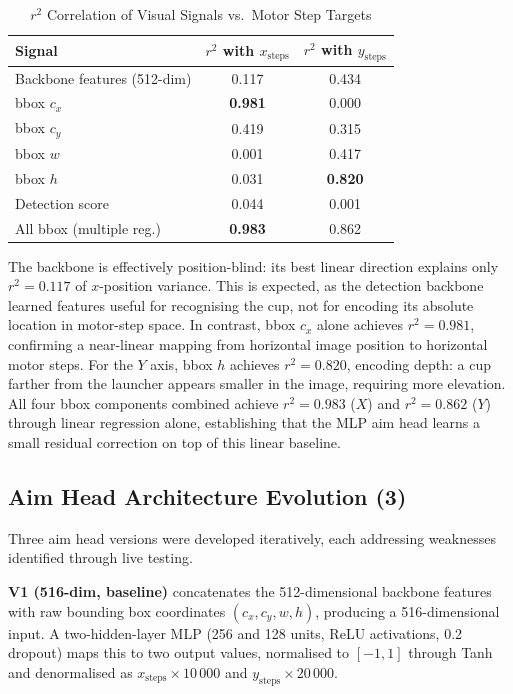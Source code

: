 \documentclass[conference]{IEEEtran}
\begin{document}
\begin{table}[ht]
\centering
\caption{$r^{2}$ Correlation of Visual Signals vs.\ Motor Step Targets}
\label{tab:r2}
\begin{tabular}{lcc}
\toprule
Signal & $r^{2}$ with $x_\text{steps}$ & $r^{2}$ with $y_\text{steps}$ \\
\midrule
Backbone features (512-dim) & 0.117 & 0.434 \\
bbox $c_x$                  & \textbf{0.981} & 0.000 \\
bbox $c_y$                  & 0.419 & 0.315 \\
bbox $w$                    & 0.001 & 0.417 \\
bbox $h$                    & 0.031 & \textbf{0.820} \\
Detection score             & 0.044 & 0.001 \\
All bbox (multiple reg.)    & \textbf{0.983} & 0.862 \\
\bottomrule
\end{tabular}
\end{table}

The backbone is effectively position-blind: its best linear direction explains
only $r^{2}=0.117$ of $x$-position variance.  This is expected, as the
detection backbone learned features useful for recognising the cup, not for
encoding its absolute location in motor-step space.  In contrast, bbox $c_x$
alone achieves $r^{2}=0.981$, confirming a near-linear mapping from horizontal
image position to horizontal motor steps.  For the $Y$ axis, bbox $h$ achieves
$r^{2}=0.820$, encoding depth: a cup farther from the launcher appears smaller
in the image, requiring more elevation.  All four bbox components combined
achieve $r^{2}=0.983$ ($X$) and $r^{2}=0.862$ ($Y$) through linear regression
alone, establishing that the MLP aim head learns a small residual correction on
top of this linear baseline.

\subsection{Aim Head Architecture Evolution (3)}

Three aim head versions were developed iteratively, each addressing weaknesses
identified through live testing.

\textbf{V1 (516-dim, baseline)} concatenates the 512-dimensional backbone
features with raw bounding box coordinates $(c_x, c_y, w, h)$, producing a
516-dimensional input.  A two-hidden-layer MLP (256 and 128 units, ReLU
activations, 0.2 dropout) maps this to two output values, normalised to
$[-1,1]$ through Tanh and denormalised as $x_\text{steps}{\times}10\,000$ and
$y_\text{steps}{\times}20\,000$.
\end{document}
